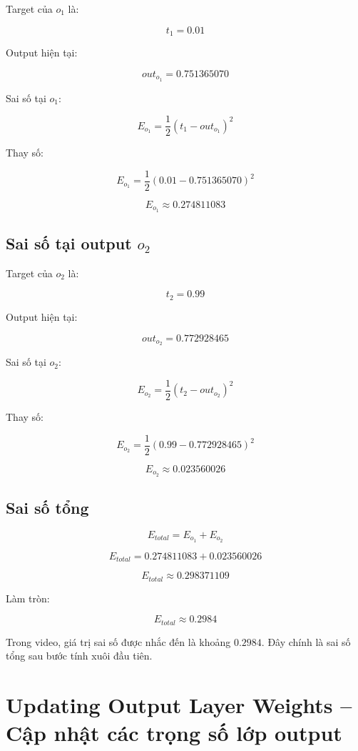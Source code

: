 Target của $o_1$ là:

\[
    t_1=0.01
\]

Output hiện tại:

\[
    out_{o_1}=0.751365070
\]

Sai số tại $o_1$:

\[
    E_{o_1}
    =
    \frac{1}{2}
    (t_1-out_{o_1})^2
\]

Thay số:

\[
    E_{o_1}
    =
    \frac{1}{2}
    (0.01-0.751365070)^2
\]

\[
    E_{o_1}\approx 0.274811083
\]

\subsection{Sai số tại output $o_2$}

Target của $o_2$ là:

\[
    t_2=0.99
\]

Output hiện tại:

\[
    out_{o_2}=0.772928465
\]

Sai số tại $o_2$:

\[
    E_{o_2}
    =
    \frac{1}{2}
    (t_2-out_{o_2})^2
\]

Thay số:

\[
    E_{o_2}
    =
    \frac{1}{2}
    (0.99-0.772928465)^2
\]

\[
    E_{o_2}\approx 0.023560026
\]

\subsection{Sai số tổng}

\[
    E_{total}=E_{o_1}+E_{o_2}
\]

\[
    E_{total}
    =
    0.274811083
    +
    0.023560026
\]

\[
    E_{total}\approx 0.298371109
\]

Làm tròn:

\[
    E_{total}\approx 0.2984
\]

\begin{ghinho}
Trong video, giá trị sai số được nhắc đến là khoảng $0.2984$. Đây chính là sai số tổng sau bước tính xuôi đầu tiên.
\end{ghinho}

\section{Updating Output Layer Weights -- Cập nhật các trọng số lớp output}

